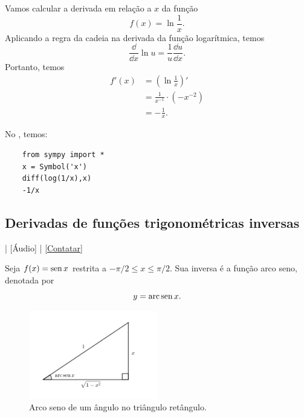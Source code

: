 \begin{ex}
  Vamos calcular a derivada em relação a $x$ da função
  \begin{equation}
    f(x) = \ln \frac{1}{x}.
  \end{equation}
  Aplicando a regra da cadeia na derivada da função logarítmica, temos
  \begin{equation}
    \frac{\dd}{\dd x}\ln u = \frac{1}{u}\frac{\dd u}{\dd x}.
  \end{equation}
  Portanto, temos
  \begin{align}
    f'(x) &= \left(\ln\frac{1}{x}\right)'\\
          &= \frac{1}{x^{-1}}\cdot (-x^{-2}) \\
          &= -\frac{1}{x}.
  \end{align}

  \ifispython
  No \sympy, temos:
  \begin{lstlisting}
    from sympy import *
    x = Symbol('x')
    diff(log(1/x),x)
    -1/x
  \end{lstlisting}
  \fi  
\end{ex}

\subsection{Derivadas de funções trigonométricas inversas}

\begin{flushright}
  [Vídeo] | [Áudio] | \href{https://phkonzen.github.io/notas/contato.html}{[Contatar]}
\end{flushright}

Seja $f(x) = \operatorname{sen} x$ restrita a $-\pi/2 \leq x \leq \pi/2$. Sua inversa é a função arco seno, denotada por
\begin{equation}
  y = \operatorname{arc}\operatorname{sen} x.
\end{equation}

\begin{figure}[H]
  \centering
  \includegraphics[width=0.5\textwidth]{./cap_deriv/dados/fig_diff_arc_sen/fig_diff_arc_sen}
  \caption{Arco seno de um ângulo no triângulo retângulo.}
  \label{fig:diff_arc_sen}
\end{figure}

